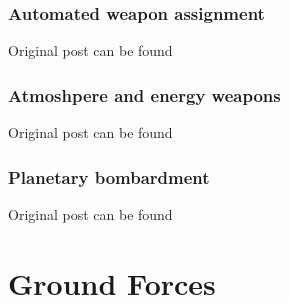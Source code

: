 \documentclass[10pt,a4paper,oneside]{article}
\begin{document}
\section{Automated weapon assignment}
Original post can be found

\section{Atmoshpere and energy weapons}
Original post can be found

\section{Planetary bombardment}
Original post can be found


\newpage
\part{Ground Forces}

\end{document}

